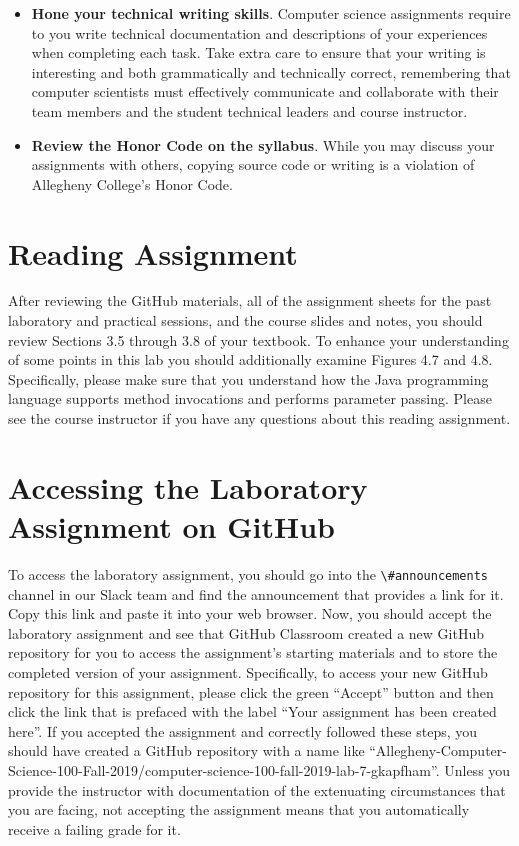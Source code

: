 \documentclass[11pt]{article}
\newcommand{\channel}[1]{\lstinline{#1}}
\begin{document}
\begin{itemize}
\item {\bf Hone your technical writing skills}. Computer science assignments
  require to you write technical documentation and descriptions of your
  experiences when completing each task. Take extra care to ensure that your
  writing is interesting and both grammatically and technically correct,
  remembering that computer scientists must effectively communicate and
  collaborate with their team members and the student technical leaders and
  course instructor.

\item {\bf Review the Honor Code on the syllabus}. While you may discuss your
  assignments with others, copying source code or writing is a violation of
  Allegheny College's Honor Code.

\end{itemize}

\section*{Reading Assignment}

After reviewing the GitHub materials, all of the assignment sheets for the past
laboratory and practical sessions, and the course slides and notes, you should
review Sections 3.5 through 3.8 of your textbook. To enhance your understanding
of some points in this lab you should additionally examine Figures 4.7 and 4.8.
Specifically, please make sure that you understand how the Java programming
language supports method invocations and performs parameter passing. Please see
the course instructor if you have any questions about this reading assignment.

\section*{Accessing the Laboratory Assignment on GitHub}

To access the laboratory assignment, you should go into the
\channel{\#announcements} channel in our Slack team and find the announcement
that provides a link for it. Copy this link and paste it into your web browser.
Now, you should accept the laboratory assignment and see that GitHub Classroom
created a new GitHub repository for you to access the assignment's starting
materials and to store the completed version of your assignment. Specifically,
to access your new GitHub repository for this assignment, please click the green
``Accept'' button and then click the link that is prefaced with the label ``Your
assignment has been created here''. If you accepted the assignment and correctly
followed these steps, you should have created a GitHub repository with a name
like
``Allegheny-Computer-Science-100-Fall-2019/computer-science-100-fall-2019-lab-7-gkapfham''.
Unless you provide the instructor with documentation of the extenuating
circumstances that you are facing, not accepting the assignment means that you
automatically receive a failing grade for it.
\end{document}
